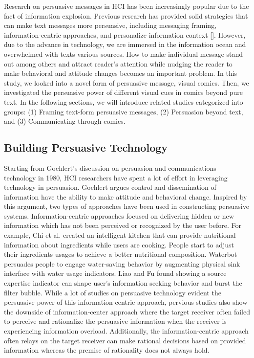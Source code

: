 
Research on persuasive messages in HCI has been increasingly popular due to the fact of information explosion. Previous research has provided solid strategies that can make text messages more persuasive, including messaging framing, information-centric approaches, and personalize information context []. However, due to the advance in technology, we are immersed in the information ocean and overwhelmed with texts various sources. How to make individual message stand out among others and attract reader's attention while nudging the reader to make behavioral and attitude changes becomes an important problem. In this study, we looked into a novel form of persuasive message, visual comics. Then, we investigated the persuasive power of different visual cues in comics beyond pure text. In the following sections, we will introduce related studies categorized into groups: (1) Framing text-form persuasive messages, (2) Persuasion beyond text, and (3) Communicating through comics.\par

\subsection{Building Persuasive Technology}
Starting from Goehlert's discussion on persuasion and communications technology in 1980, HCI researchers have spent a lot of effort in leveraging technology in persuasion. Goehlert argues control and dissemination of information have the ability to make attitude and behavioral change. Inspired by this argument, two types of approaches have been used in constructing persuasive systems. Information-centric approaches focused on delivering hidden or new information which has not been perceived or recognized by the user before. For example, Chi et al. created an intelligent kitchen that can provide nutritional information about ingredients while users are cooking. People start to adjust their ingredients usages to achieve a better nutritional composition. Waterbot persuades people to engage water-saving behavior by augmenting physical sink interface with water usage indicators.
Liao and Fu found showing a source expertise indicator can shape user's information seeking behavior and burst the filter bubble. While a lot of studies on persuasive technology evident the persuasive power of this information-centric approach, pervious studies also show the downside of information-center approach where the target receiver often failed to perceive and rationalize the persuasive information when the receiver is experiencing information overload. Additionally, the information-centric approach often relays on the target receiver can make rational decisions based on provided information whereas the premise of rationality does not always hold.\par

